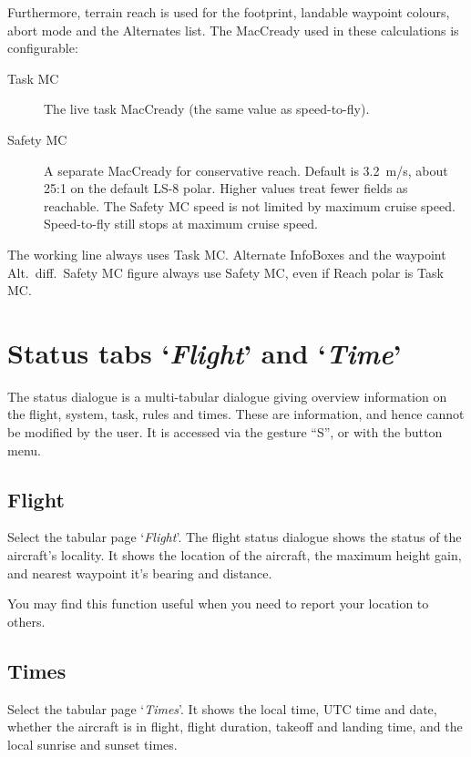 Furthermore, terrain reach is used for the footprint, landable waypoint
colours, abort mode and the Alternates list.  The MacCready used in these
calculations is configurable:
\begin{description}
\item[Task MC] The live task MacCready (the same value as speed-to-fly).
\item[Safety MC] A separate MacCready for conservative reach.  Default is
  3.2~m/s, about 25:1 on the default LS-8 polar.  Higher values treat fewer
  fields as reachable.  The Safety MC speed is not limited by maximum
  cruise speed.  Speed-to-fly still stops at maximum cruise speed.
\end{description}
The working line always uses Task MC.  Alternate InfoBoxes and the
waypoint Alt.\ diff.\ Safety MC figure always use Safety MC, even if
Reach polar is Task MC.

\section{Status tabs `\emph{Flight}' and `\emph{Time}'}\label{sec:flight-status}

The status dialogue is a multi-tabular dialogue giving overview information on the 
flight, system, task, rules and times.
These are information, and hence cannot be modified by the user.
It is accessed via the gesture ``S'', or with the button menu.
\begin{quote}
\blink{}
\end{quote}

\subsection*{Flight}
Select the tabular page `\emph{Flight}'. 
The flight status dialogue shows the status of the aircraft's locality.
It shows the location of the aircraft, the
maximum height gain, and nearest waypoint it's bearing and distance.

You may find this function useful when you need to report your
location to others.

\subsection*{Times}\label{sec:time-status}
Select the tabular page `\emph{Times}'. 
It shows the local time, UTC time and date, whether the aircraft is
in flight, flight duration, takeoff and landing time, and the local
sunrise and sunset times.

